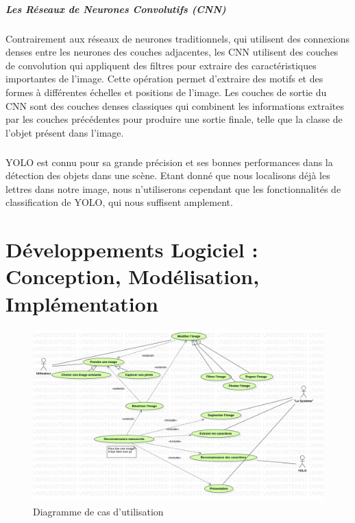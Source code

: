 \documentclass[a4paper]{article}
\begin{document}
					\subparagraph{Les Réseaux de Neurones Convolutifs (CNN)} 
					Contrairement aux réseaux de neurones traditionnels, qui utilisent des connexions denses entre les neurones des couches adjacentes, les CNN utilisent des couches de convolution qui appliquent des filtres pour extraire des caractéristiques importantes de l'image.
					Cette opération permet d'extraire des motifs et des formes à différentes échelles et positions de l'image.
					Les couches de sortie du CNN sont des couches denses classiques qui combinent les informations extraites par les couches précédentes pour produire une sortie finale, telle que la classe de l'objet présent dans l'image.

					\subparagraph{} YOLO est connu pour sa grande précision et ses bonnes performances dans la détection des objets dans une scène. Etant donné que nous localisons déjà les lettres dans notre image, nous n'utiliserons cependant que les fonctionnalités de classification de YOLO, qui nous suffisent amplement.

	\newpage
	\section{Développements Logiciel : Conception, Modélisation, Implémentation}
		\begin{figure}[h]
			\centering
			\includegraphics[width=\textwidth]{UseCaseDiagram.png}
			\caption{Diagramme de cas d'utilisation}
			\label{fig:useCaseDiagram}
		\end{figure}
\end{document}

